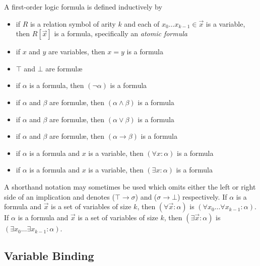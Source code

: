 		A first-order logic formula is defined inductively by
		\begin{itemize}
		\item if $R$ is a relation symbol of arity $k$ and each of $x_0 \ldots x_{k-1} \in \vec{x}$ is a variable, then $R[\vec{x}]$ is a formula, specifically an \emph{atomic formula}
		\item if $x$ and $y$ are variables, then $x = y$ is a formula
		\item $\top$ and $\bot$ are formul{\ae}
		\item if $\alpha$ is a formula, then $(\neg\alpha)$ is a formula
		\item if $\alpha$ and $\beta$ are formul{\ae}, then $(\alpha \wedge \beta)$ is a formula
		\item if $\alpha$ and $\beta$ are formul{\ae}, then $(\alpha \vee \beta)$ is a formula
		\item if $\alpha$ and $\beta$ are formul{\ae}, then $(\alpha \to \beta)$ is a formula
		\item if $\alpha$ is a formula and $x$ is a variable, then $(\forall x : \alpha)$ is a formula
		\item if $\alpha$ is a formula and $x$ is a variable, then $(\exists x : \alpha)$ is a formula
		\end{itemize}

		A shorthand notation may sometimes be used which omits either the left
		or right side of an implication and denotes ($\top \to \sigma$) and
		($\sigma \to \bot$) respectively.  If $\alpha$ is a formula and
		$\vec{x}$ is a set of variables of size $k$, then $(\forall \vec{x} :
		\alpha)$ is $(\forall x_0 \ldots \forall x_{k-1} : \alpha)$.  If
		$\alpha$ is a formula and $\vec{x}$ is a set of variables of size $k$,
		then $(\exists \vec{x} : \alpha)$ is $(\exists x_0 \ldots \exists
		x_{k-1} : \alpha)$.

	\subsection{Variable Binding}

